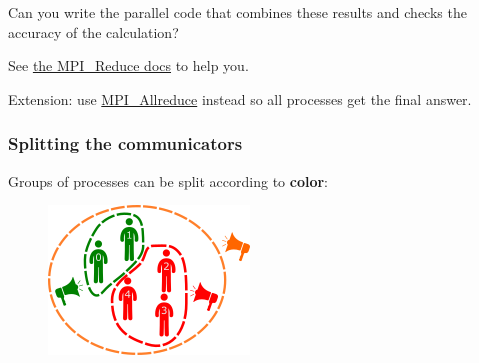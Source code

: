 \begin{Shaded}
\begin{Highlighting}[]

        \NormalTok{;}
        \NormalTok{+ }\NormalTok{;}
       \NormalTok{;}
       \NormalTok{;}
       \NormalTok{(} 
      \NormalTok{\{}
        \NormalTok{;}
      \NormalTok{\}}
\end{Highlighting}
\end{Shaded}

Can you write the parallel code that combines these results and checks
the accuracy of the calculation?

See \href{https://www.open-mpi.org/doc/v3.0/man3/MPI_Reduce.3.php}{the
MPI\_Reduce docs} to help you.

Extension: use
\href{https://www.open-mpi.org/doc/v3.0/man3/MPI_Allreduce.3.php}{MPI\_Allreduce}
instead so all processes get the final answer.

\subsubsection{Splitting the
communicators}\label{splitting-the-communicators}

Groups of processes can be split according to \textbf{color}:

\begin{figure}[htbp]
\centering
\includegraphics{06MPI/figures/split.png}
\end{figure}

\begin{Shaded}
\begin{Highlighting}[]
   
\end{Highlighting}
\end{Shaded}

